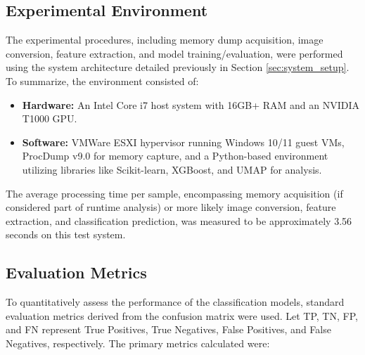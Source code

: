 \subsection{Experimental Environment}
\label{subsec:exp_environment}

The experimental procedures, including memory dump acquisition, image conversion, feature extraction, and model training/evaluation, were performed using the system architecture detailed previously in Section \ref{sec:system_setup}. To summarize, the environment consisted of:
\begin{itemize}
    \item \textbf{Hardware:} An Intel Core i7 host system with 16GB+ RAM and an NVIDIA T1000 GPU.
    \item \textbf{Software:} VMWare ESXI hypervisor running Windows 10/11 guest VMs, ProcDump v9.0 for memory capture, and a Python-based environment utilizing libraries like Scikit-learn, XGBoost, and UMAP for analysis.
\end{itemize}
The average processing time per sample, encompassing memory acquisition (if considered part of runtime analysis) or more likely image conversion, feature extraction, and classification prediction, was measured to be approximately 3.56 seconds on this test system.

\subsection{Evaluation Metrics}
\label{subsec:eval_metrics}

To quantitatively assess the performance of the classification models, standard evaluation metrics derived from the confusion matrix were used. Let TP, TN, FP, and FN represent True Positives, True Negatives, False Positives, and False Negatives, respectively. The primary metrics calculated were:

